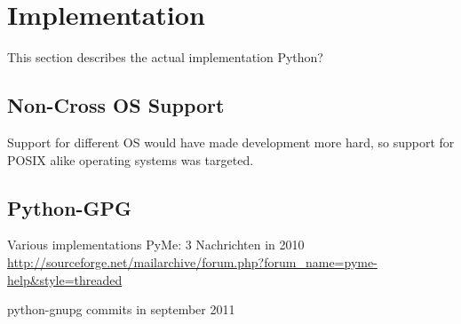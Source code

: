 \section{Implementation}
This section describes the actual implementation
Python?
\subsection{Non-Cross OS Support}
Support for different OS would have made development more
hard, so support for POSIX alike operating systems was targeted.

\subsection{Python-GPG}
Various implementations \cite{python-gpg}
PyMe: 3 Nachrichten in 2010
\url{http://sourceforge.net/mailarchive/forum.php?forum_name=pyme-help&style=threaded}

python-gnupg commits in september 2011 \cite{python-gnupg}
